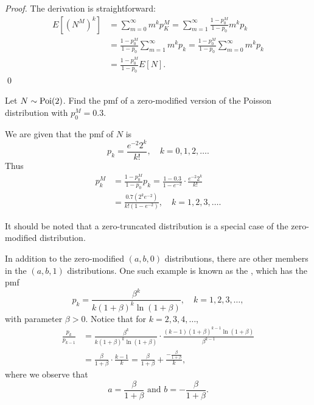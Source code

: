 \documentclass[notoc,notitlepage]{tufte-book}
\begin{document}
\begin{proof}
  The derivation is straightforward:
  \begin{align*}
    E \left[ \left( N^M \right)^k \right] &= \sum_{m = 0}^{\infty} m^k p_K^M = \sum_{m=1}^{\infty} \frac{1 - p_0^M}{1 - p_0} m^k p_k \\
                                          &= \frac{1 - p_0^M}{1 - p_0} \sum_{m=1}^{\infty} m^k p_k = \frac{1 - p_0^M}{1 - p_0} \sum_{m = 0}^{\infty} m^k p_k \\
                                          &= \frac{1 - p_0^M}{1 - p_0} E \left[ N \right].
  \end{align*}\qed\
\end{proof}

\begin{eg}
  Let $N \sim \operatorname{Poi}(2)$. Find the pmf of a zero-modified version of the Poisson distribution with $p_0^M = 0.3$.
\end{eg}

\begin{solution}
  We are given that the pmf of $N$ is
  \begin{equation*}
    p_k = \frac{e^{-2} 2^k}{k!}, \quad k = 0, 1, 2, \ldots .
  \end{equation*}
  Thus
  \begin{align*}
    p_k^M &= \frac{1 - p_0^M}{1 - p_0} p_k = \frac{1 - 0.3}{1 - e^{-2}} \cdot \frac{e^{-2} 2^k}{k!} \\
          &= \frac{0.7 \left( 2^k e^{-2} \right)}{k! (1 - e^{-2})}, \quad k = 1, 2, 3, \ldots.
  \end{align*}
\end{solution}

\begin{note}
  It should be noted that a zero-truncated distribution is a special case of the zero-modified distribution.
\end{note}

In addition to the zero-modified $(a, b, 0)$ distributions, there are other members in the $(a, b, 1)$ distributions. One such example is known as the , which has the pmf
\begin{equation*}
  p_k = \frac{\beta^k}{k ( 1 + \beta )^k \ln ( 1 + \beta )} , \quad k = 1, 2, 3, \ldots,
\end{equation*}
with parameter $\beta > 0$. Notice that for $k = 2, 3, 4, \ldots$,
\begin{align*}
  \frac{p_k}{p_{k - 1}} &= \frac{\beta^k}{k ( 1 + \beta )^k \ln (1 + \beta)} \cdot \frac{(k - 1) ( 1 + \beta )^{k - 1} \ln ( 1 + \beta )}{\beta^{k - 1}} \\
                        &= \frac{\beta}{1 + \beta} \cdot \frac{k - 1}{k} = \frac{\beta}{1 + \beta} + \frac{- \frac{\beta}{1 + \beta}}{k},
\end{align*}
where we observe that
\begin{equation*}
  a = \frac{\beta}{1 + \beta} \text{ and } b = - \frac{\beta}{1 + \beta}.
\end{equation*}
\end{document}
